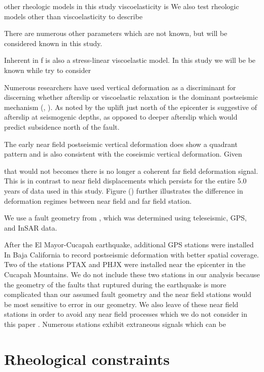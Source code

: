 \documentclass[12pt]{article}
\begin{document}
other rheologic models in this study      viscoelasticity is We also test rheologic models other than viscoelasticity to describe    




There are numerous other parameters which are not known, but will be considered known in this study.   


   Inherent in f is also a stress-linear viscoelastic model.   In this study we will be be known while try to consider             

Numerous researchers have used vertical deformation   
as a discriminant for discerning whether afterslip or viscoelastic relaxation is the dominant postseismic mechanism (\cite{Hetland2014}, \cite{Pollitz2012} \cite{Rollins2015}).  As noted by \cite{Rollins2015} the uplift just north of the epicenter is suggestive of afterslip at seismogenic depths, as opposed to deeper afterslip which would predict subsidence north of the fault.    

   The early near field postseismic vertical deformation does show a quadrant pattern and is also consistent with the coseismic vertical deformation.  Given         

that would not becomes there is no longer a coherent far field deformation signal. This is in contrast to near field displacements which persists for the entire 5.0 years of data used in this study. Figure () further illustrates the difference in deformation regimes between near field and far field station.  



We use a fault geometry from \cite{Wei2011}, which was determined using teleseismic, GPS, and InSAR data.  

After the El Mayor-Cucapah earthquake, additional GPS stations were installed In Baja California to record postseismic deformation with better spatial coverage.  Two of the stations PTAX and PHJX were installed near the epicenter in the Cucapah Mountains.  We do not include these two stations in our analysis because the geometry of the faults that ruptured during the earthquake is more complicated than our assumed fault geometry \cite{Oskin2012} \cite{Fletcher2014} and the near field stations would be most sensitive to error in our geometry. We also leave of these near field stations in order to avoid any near field processes which we do not consider in this paper \cite{Gonzalez-ortega2014}. Numerous stations exhibit extraneous signals which can be 

\section*{Rheological constraints}
\end{document}
